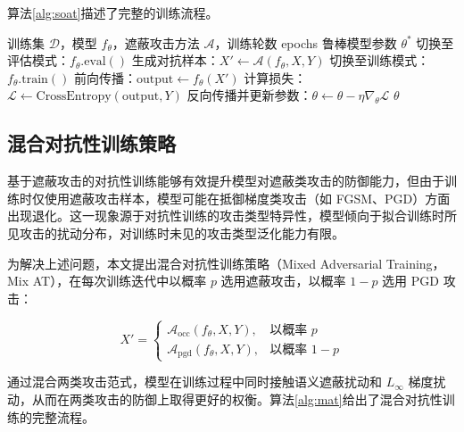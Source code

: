 算法\ref{alg:soat}描述了完整的训练流程。

\begin{algorithm}[htbp]
  \caption{基于遮蔽攻击的对抗性训练}
  \label{alg:soat}
  \begin{algorithmic}[1]
    \Require 训练集 $\mathcal{D}$，模型 $f_{\theta}$，遮蔽攻击方法 $\mathcal{A}$，训练轮数 epochs
    \Ensure 鲁棒模型参数 $\theta^*$
        \State 切换至评估模式：$f_{\theta}.\mathrm{eval}()$
        \State 生成对抗样本：$X' \leftarrow \mathcal{A}(f_{\theta}, X, Y)$
        \State 切换至训练模式：$f_{\theta}.\mathrm{train}()$
        \State 前向传播：$\mathrm{output} \leftarrow f_{\theta}(X')$
        \State 计算损失：$\mathcal{L} \leftarrow \mathrm{CrossEntropy}(\mathrm{output}, Y)$
        \State 反向传播并更新参数：$\theta \leftarrow \theta - \eta \nabla_{\theta} \mathcal{L}$
      \EndFor
    \EndFor
    \State \Return $\theta$
  \end{algorithmic}
\end{algorithm}

\subsection{混合对抗性训练策略}

基于遮蔽攻击的对抗性训练能够有效提升模型对遮蔽类攻击的防御能力，但由于训练时仅使用遮蔽攻击样本，模型可能在抵御梯度类攻击（如 FGSM\cite{goodfellow2015fgsm}、PGD\cite{madry2018pgd}）方面出现退化。这一现象源于对抗性训练的攻击类型特异性，模型倾向于拟合训练时所见攻击的扰动分布，对训练时未见的攻击类型泛化能力有限。

为解决上述问题，本文提出混合对抗性训练策略（Mixed Adversarial Training，Mix AT），在每次训练迭代中以概率 $p$ 选用遮蔽攻击，以概率 $1-p$ 选用 PGD 攻击：

\begin{equation}
  X' = \begin{cases}
    \mathcal{A}_{\text{occ}}(f_{\theta}, X, Y), & \text{以概率 } p \\[4pt]
    \mathcal{A}_{\text{pgd}}(f_{\theta}, X, Y), & \text{以概率 } 1-p
  \end{cases}
\end{equation}

通过混合两类攻击范式，模型在训练过程中同时接触语义遮蔽扰动和 $L_{\infty}$ 梯度扰动，从而在两类攻击的防御上取得更好的权衡。算法\ref{alg:mat}给出了混合对抗性训练的完整流程。

